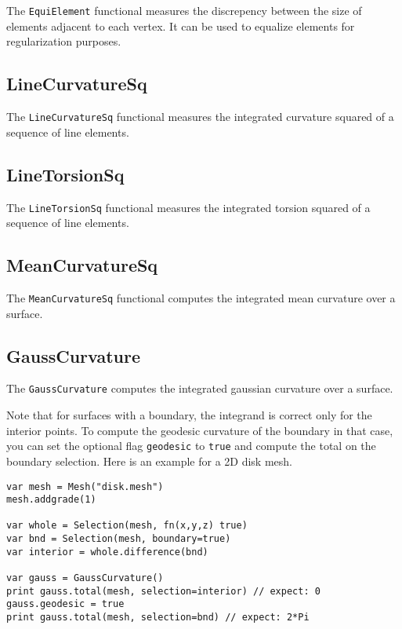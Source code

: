 The \texttt{EquiElement} functional measures the discrepency between the
size of elements adjacent to each vertex. It can be used to equalize
elements for regularization purposes.

\hypertarget{linecurvaturesq}{%
\subsection{LineCurvatureSq}\label{linecurvaturesq}}

The \texttt{LineCurvatureSq} functional measures the integrated
curvature squared of a sequence of line elements.

\hypertarget{linetorsionsq}{%
\subsection{LineTorsionSq}\label{linetorsionsq}}

The \texttt{LineTorsionSq} functional measures the integrated torsion
squared of a sequence of line elements.

\hypertarget{meancurvaturesq}{%
\subsection{MeanCurvatureSq}\label{meancurvaturesq}}

The \texttt{MeanCurvatureSq} functional computes the integrated mean
curvature over a surface.

\hypertarget{gausscurvature}{%
\subsection{GaussCurvature}\label{gausscurvature}}

The \texttt{GaussCurvature} computes the integrated gaussian curvature
over a surface.

Note that for surfaces with a boundary, the integrand is correct only
for the interior points. To compute the geodesic curvature of the
boundary in that case, you can set the optional flag \texttt{geodesic}
to \texttt{true} and compute the total on the boundary selection. Here
is an example for a 2D disk mesh.

\begin{lstlisting}
var mesh = Mesh("disk.mesh")
mesh.addgrade(1)

var whole = Selection(mesh, fn(x,y,z) true)
var bnd = Selection(mesh, boundary=true)
var interior = whole.difference(bnd)

var gauss = GaussCurvature()
print gauss.total(mesh, selection=interior) // expect: 0
gauss.geodesic = true
print gauss.total(mesh, selection=bnd) // expect: 2*Pi
\end{lstlisting}

